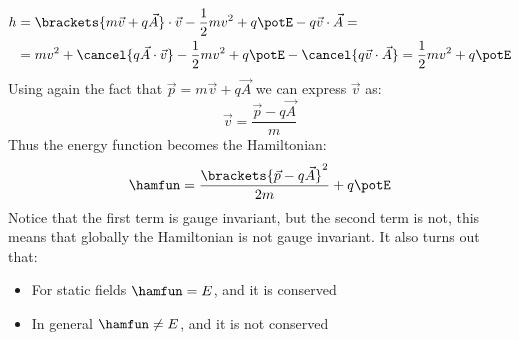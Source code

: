 \begin{equation}
  \begin{split}
    h &= \brackets{m\vec{v} + q\vec{A}}\cdot \vec{v} - \dfrac{1}{2}mv^2 +q\potE - q\vec{v} \cdot \vec{A} =\\
    &= mv^2 + \cancel{q\vec{A} \cdot \vec{v}} - \dfrac{1}{2}mv^2 + q\potE - \cancel{ q\vec{v} \cdot \vec{A}} = \dfrac{1}{2}mv^2 + q\potE
  \end{split}
\end{equation}
Using again the fact that $\vec{p} = m\vec{v} + q\vec{A}$ we can express $\vec{v}$ as:
\begin{equation}
  \vec{v} = \dfrac{\vec{p} - q\vec{A}}{m}
\end{equation}
Thus the energy function becomes the Hamiltonian:
\begin{equation}
  \hamfun = \dfrac{\brackets{\vec{p} - q\vec{A}}^2}{2m} + q\potE
\end{equation}
Notice that the first term is gauge invariant, but the second term is not, this means that globally the Hamiltonian is not gauge invariant. It also turns out that:
\begin{itemize}
  \item For static fields $\hamfun = E$, and it is conserved
  \item In general $\hamfun \neq E$, and it is not conserved
\end{itemize}
